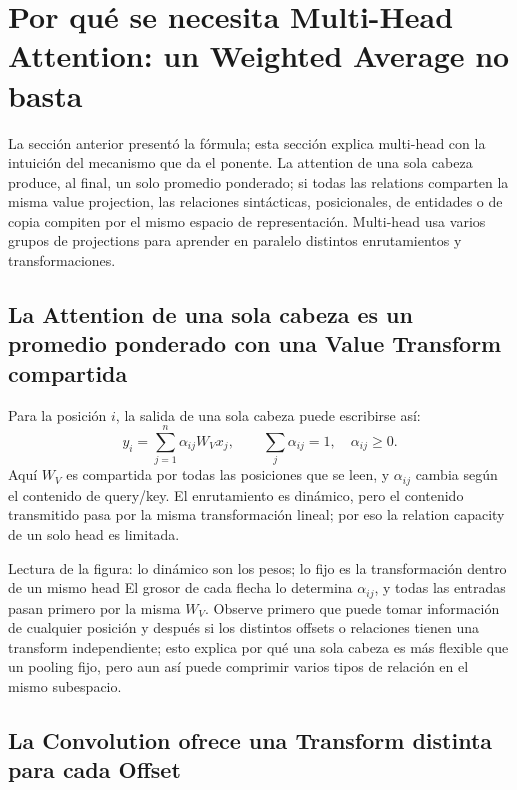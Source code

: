\section{Por qué se necesita Multi-Head Attention: un Weighted Average no basta}

La sección anterior presentó la fórmula; esta sección explica multi-head con la intuición del mecanismo que da el ponente. La attention de una sola cabeza produce, al final, un solo promedio ponderado; si todas las relations comparten la misma value projection, las relaciones sintácticas, posicionales, de entidades o de copia compiten por el mismo espacio de representación. Multi-head usa varios grupos de projections para aprender en paralelo distintos enrutamientos y transformaciones.

\subsection{La Attention de una sola cabeza es un promedio ponderado con una Value Transform compartida}

Para la posición $i$, la salida de una sola cabeza puede escribirse así:
\[
y_i=\sum_{j=1}^{n}\alpha_{ij}W_Vx_j,
\qquad \sum_j\alpha_{ij}=1,\quad \alpha_{ij}\ge 0.
\]
Aquí $W_V$ es compartida por todas las posiciones que se leen, y $\alpha_{ij}$ cambia según el contenido de query/key. El enrutamiento es dinámico, pero el contenido transmitido pasa por la misma transformación lineal; por eso la relation capacity de un solo head es limitada.


\begin{knowledgebox}{Lectura de la figura: lo dinámico son los pesos; lo fijo es la transformación dentro de un mismo head}
El grosor de cada flecha lo determina $\alpha_{ij}$, y todas las entradas pasan primero por la misma $W_V$. Observe primero que puede tomar información de cualquier posición y después si los distintos offsets o relaciones tienen una transform independiente; esto explica por qué una sola cabeza es más flexible que un pooling fijo, pero aun así puede comprimir varios tipos de relación en el mismo subespacio.
\end{knowledgebox}

\subsection{La Convolution ofrece una Transform distinta para cada Offset}


